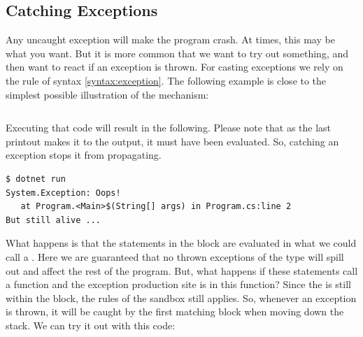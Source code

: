 \subsection{Catching Exceptions}

Any uncaught exception will make the program crash. At times, this may be what you want. But it is more common that we want to try out something, and then want to react if an exception is thrown. For casting exceptions we rely on the  rule of syntax \ref{syntax:exception}. The following example is close to the simplest possible illustration of the mechanism:

\inputminted[firstline=1]{csharp}{../src/csharp/exceptions/catching/Program.cs}

Executing that code will result in the following. Please note that as the last printout makes it to the output, it must have been evaluated. So, catching an exception stops it from propagating.

\begin{verbatim}
$ dotnet run
System.Exception: Oops!
   at Program.<Main>$(String[] args) in Program.cs:line 2
But still alive ...
\end{verbatim}

What happens is that the statements in the  block are evaluated in what we could call a . Here we are guaranteed that no thrown exceptions of the  type will spill out and affect the rest of the program. But, what happens if these statements call a function and the exception production site is in this function? Since the  is still within the  block, the rules of the sandbox still applies. So, whenever an exception is thrown, it will be caught by the first matching  block when moving down the stack. We can try it out with this code:

